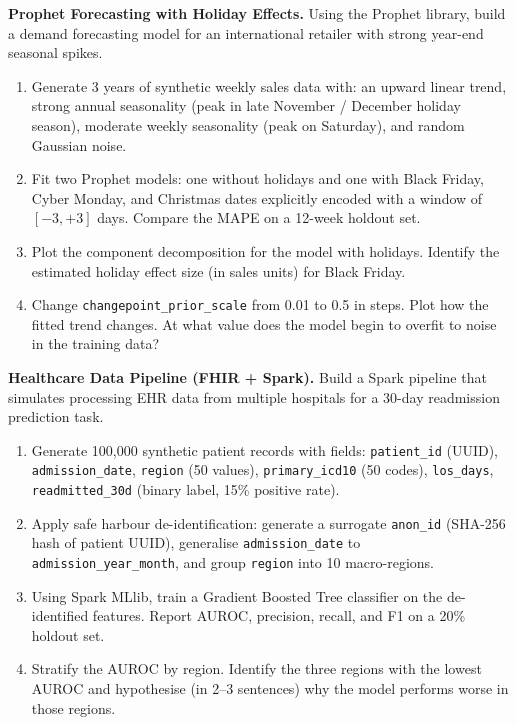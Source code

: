 \pe \textbf{Prophet Forecasting with Holiday Effects.}
Using the Prophet library, build a demand forecasting model for an
international retailer with strong year-end seasonal spikes.
\begin{enumerate}[label=(\alph*)]
  \item Generate 3 years of synthetic weekly sales data with: an upward
        linear trend, strong annual seasonality (peak in late November /
        December holiday season), moderate weekly seasonality (peak on
        Saturday), and random Gaussian noise.
  \item Fit two Prophet models: one without holidays and one with
        Black Friday, Cyber Monday, and Christmas dates explicitly encoded
        with a window of $[-3, +3]$ days. Compare the MAPE on a 12-week
        holdout set.
  \item Plot the component decomposition for the model with holidays.
        Identify the estimated holiday effect size (in sales units) for
        Black Friday.
  \item Change \texttt{changepoint\_prior\_scale} from 0.01 to 0.5 in
        steps. Plot how the fitted trend changes. At what value does the
        model begin to overfit to noise in the training data?
\end{enumerate}

\pe \textbf{Healthcare Data Pipeline (FHIR + Spark).}
Build a Spark pipeline that simulates processing EHR data from multiple
hospitals for a 30-day readmission prediction task.
\begin{enumerate}[label=(\alph*)]
  \item Generate 100{,}000 synthetic patient records with fields:
        \texttt{patient\_id} (UUID), \texttt{admission\_date},
        \texttt{region} (50 values), \texttt{primary\_icd10} (50 codes),
        \texttt{los\_days}, \texttt{readmitted\_30d} (binary label,
        15\% positive rate).
  \item Apply safe harbour de-identification: generate a surrogate
        \texttt{anon\_id} (SHA-256 hash of patient UUID), generalise
        \texttt{admission\_date} to \texttt{admission\_year\_month},
        and group \texttt{region} into 10 macro-regions.
  \item Using Spark MLlib, train a Gradient Boosted Tree classifier
        on the de-identified features. Report AUROC, precision, recall,
        and F1 on a 20\% holdout set.
  \item Stratify the AUROC by region. Identify the three regions with
        the lowest AUROC and hypothesise (in 2--3 sentences) why the
        model performs worse in those regions.
\end{enumerate}

